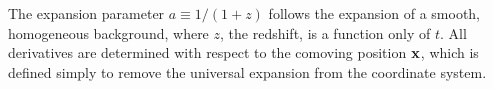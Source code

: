 %
The expansion parameter $a \equiv 1/(1 + z)$ follows the expansion of
a smooth, homogeneous background, where $z$, the redshift, is a
function only of $t$.  All derivatives are determined with respect to
the comoving position $\mathbf{x}$, which is defined simply to remove the
universal expansion from the coordinate system.


